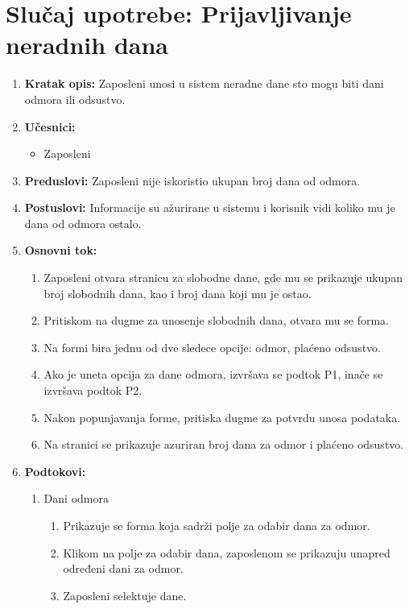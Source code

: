 \documentclass[a4paper]{article}
\begin{document}
\section{Slučaj upotrebe: Prijavljivanje neradnih dana}
\begin{enumerate}
    \item \textbf{Kratak opis:} Zaposleni unosi u sistem neradne dane sto mogu biti dani odmora ili odsustvo.
    \item \textbf{Učesnici:}
        \begin{itemize}
            \item Zaposleni
        \end{itemize}
    \item \textbf{Preduslovi:} Zaposleni nije iskoristio ukupan broj dana od odmora.
    \item \textbf{Postuslovi:} Informacije su ažurirane u sistemu i korisnik vidi koliko mu je dana od odmora ostalo.
    \item \textbf{Osnovni tok:}
        \begin{enumerate}
            \item Zaposleni otvara stranicu za slobodne dane, gde mu se prikazuje ukupan broj slobodnih dana, kao i broj dana koji mu je ostao.
            \item Pritiskom na dugme za unosenje slobodnih dana, otvara mu se forma.
            \item Na formi bira jednu od dve sledece opcije: odmor, plaćeno odsustvo.
            \item Ako je uneta opcija za dane odmora, izvršava se podtok P1, inače se izvršava podtok P2.
            \item Nakon popunjavanja forme, pritiska dugme za potvrdu unosa podataka.
            \item Na stranici se prikazuje azuriran broj dana za odmor i plaćeno odsustvo.
        \end{enumerate}
    \item \textbf{Podtokovi:}
        \begin{enumerate}
            \item Dani odmora
            \begin{enumerate}
                \item Prikazuje se forma koja sadrži polje za odabir dana za odmor.
                \item Klikom na polje za odabir dana, zaposlenom se prikazuju unapred određeni dani za odmor.
                \item Zaposleni selektuje dane.

\end{enumerate}
\end{enumerate}
\end{enumerate}
\end{document}
